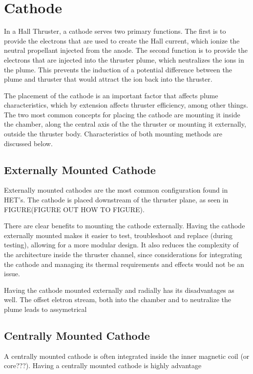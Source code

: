 \section{Cathode}

In a Hall Thruster, a cathode serves two primary functions. The first is to provide the electrons that are used to create the Hall current, which ionize the neutral propellant injected from the anode. The second function is to provide the electrons that are injected into the thruster plume, which neutralizes the ions in the plume. This prevents the induction of a potential difference between the plume and thruster that would attract the ion back into the thruster. 

The placement of the cathode is an important factor that affects plume characteristics, which by extension affects thruster efficiency, among other things. The two most common concepts for placing the cathode are mounting it inside the chamber, along the central axis of the the thruster or mounting it externally, outside the thruster body. Characteristics of both mounting methods are discussed below.

\subsection{Externally Mounted Cathode}

Externally mounted cathodes are the most common configuration found in \ac{HET}'s. The cathode is placed downstream of the thruster plane, as seen in FIGURE(FIGURE OUT HOW TO FIGURE). 

There are clear benefits to mounting the cathode externally. Having the cathode externally mounted makes it easier to test, troubleshoot and replace (during testing), allowing for a more modular design. It also reduces the complexity of the architecture inside the thruster channel, since considerations for integrating the cathode and managing its thermal requirements and effects would not be an issue.

Having the cathode mounted externally and radially has its disadvantages as well. The offset eletron stream, both into the chamber and to neutralize the plume leads to assymetrical  

\subsection{Centrally Mounted Cathode}

A centrally mounted cathode is often integrated inside the inner magnetic coil (or core???). Having a centrally mounted cathode is highly advantage